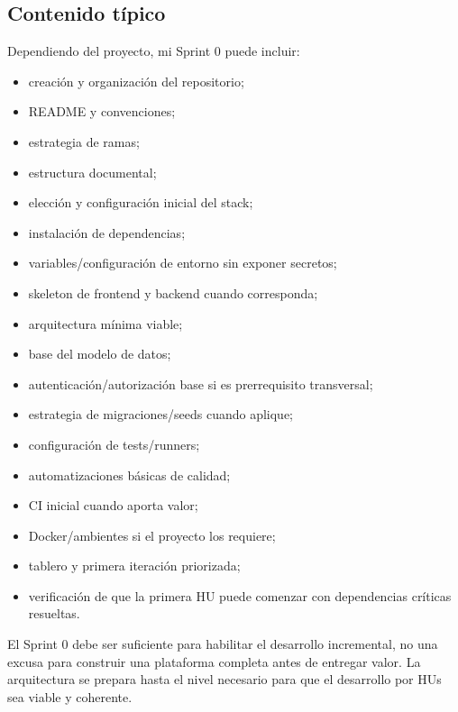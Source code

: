 \documentclass[11pt,a4paper]{article}
\begin{document}
\subsection{Contenido típico}

Dependiendo del proyecto, mi Sprint 0 puede incluir:

\begin{itemize}
    \item creación y organización del repositorio;
    \item README y convenciones;
    \item estrategia de ramas;
    \item estructura documental;
    \item elección y configuración inicial del stack;
    \item instalación de dependencias;
    \item variables/configuración de entorno sin exponer secretos;
    \item skeleton de frontend y backend cuando corresponda;
    \item arquitectura mínima viable;
    \item base del modelo de datos;
    \item autenticación/autorización base si es prerrequisito transversal;
    \item estrategia de migraciones/seeds cuando aplique;
    \item configuración de tests/runners;
    \item automatizaciones básicas de calidad;
    \item CI inicial cuando aporta valor;
    \item Docker/ambientes si el proyecto los requiere;
    \item tablero y primera iteración priorizada;
    \item verificación de que la primera HU puede comenzar con dependencias críticas resueltas.
\end{itemize}

\begin{notebox}
El Sprint 0 debe ser suficiente para habilitar el desarrollo incremental, no una excusa para construir una plataforma completa antes de entregar valor. La arquitectura se prepara hasta el nivel necesario para que el desarrollo por HUs sea viable y coherente.
\end{notebox}

\clearpage
\end{document}
